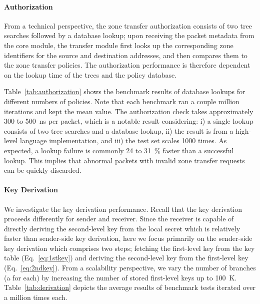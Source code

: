 \paragraph{Authorization}
From a technical perspective, the zone transfer authorization consists of two tree searches followed
by a database lookup;
upon receiving the packet metadata from the core module, the transfer module first looks
up the corresponding zone identifiers for the source and destination addresses, and then
compares them to the zone transfer policies. The authorization performance is therefore
dependent on the lookup time of the trees and the policy database.

Table~\ref{tab:authorization} shows
the benchmark results of database lookups for different numbers of policies.
Note that each benchmark ran a couple million iterations and kept the mean value.
The authorization check takes approximately 300 to \SI{500}{ns} per packet, which is a
notable result considering: i) a single lookup consists of two tree searches and a database lookup, ii) the result
is from a high-level language implementation, and iii) the test set scales 1000 times.
As expected, a lookup failure is commonly 24 to 31~\% faster than a successful lookup.
This implies that abnormal packets with invalid zone transfer requests can be quickly
discarded.


\paragraph{Key Derivation}
We investigate the key derivation performance. Recall that the key derivation proceeds
differently for sender and receiver. Since the receiver is capable of directly deriving the
second-level key from the local secret which is relatively faster than sender-side key
derivation, here we focus primarily on the sender-side key derivation which comprises two steps;
fetching the first-level key from the key table (Eq.~\ref{eq:1stkey}) and deriving the
second-level key from the first-level key (Eq.~\ref{eq:2ndkey}). From a scalability
perspective, we vary the number of branches (a \tp for each) by increasing the number of stored
first-level keys up to \SI{100}{K}. Table~\ref{tab:derivation} depicts the average results of
benchmark tests iterated over a million times each.

